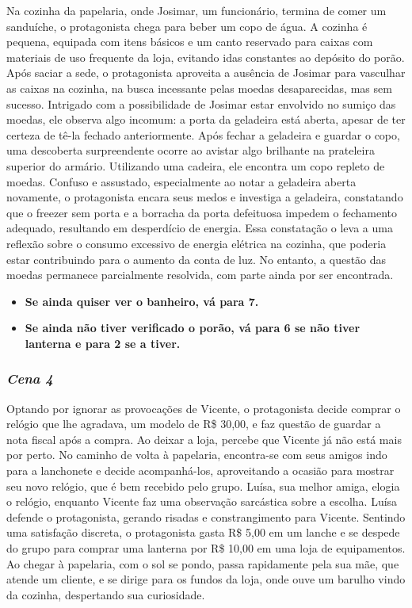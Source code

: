 Na cozinha da papelaria, onde Josimar, um funcionário, termina de comer um sanduíche, o protagonista chega para beber um copo de água. A cozinha é pequena, equipada com itens básicos e um canto reservado para caixas com materiais de uso frequente da loja, evitando idas constantes ao depósito do porão. Após saciar a sede, o protagonista aproveita a ausência de Josimar para vasculhar as caixas na cozinha, na busca incessante pelas moedas desaparecidas, mas sem sucesso. Intrigado com a possibilidade de Josimar estar envolvido no sumiço das moedas, ele observa algo incomum: a porta da geladeira está aberta, apesar de ter certeza de tê-la fechado anteriormente. Após fechar a geladeira e guardar o copo, uma descoberta surpreendente ocorre ao avistar algo brilhante na prateleira superior do armário. Utilizando uma cadeira, ele encontra um copo repleto de moedas. Confuso e assustado, especialmente ao notar a geladeira aberta novamente, o protagonista encara seus medos e investiga a geladeira, constatando que o freezer sem porta e a borracha da porta defeituosa impedem o fechamento adequado, resultando em desperdício de energia. Essa constatação o leva a uma reflexão sobre o consumo excessivo de energia elétrica na cozinha, que poderia estar contribuindo para o aumento da conta de luz. No entanto, a questão das moedas permanece parcialmente resolvida, com parte ainda por ser encontrada.

\begin{itemize}
	\item \textbf{Se ainda quiser ver o banheiro, vá para 7.}
	\item \textbf{Se ainda não tiver verificado o porão, vá para 6 se não tiver lanterna e para 2 se a tiver.}
\end{itemize}


\bigskip\medskip

\subsubsection*{\textit{\textbf{Cena 4}}}

Optando por ignorar as provocações de Vicente, o protagonista decide comprar o relógio que lhe agradava, um modelo de R\$ 30,00, e faz questão de guardar a nota fiscal após a compra. Ao deixar a loja, percebe que Vicente já não está mais por perto. No caminho de volta à papelaria, encontra-se com seus amigos indo para a lanchonete e decide acompanhá-los, aproveitando a ocasião para mostrar seu novo relógio, que é bem recebido pelo grupo. Luísa, sua melhor amiga, elogia o relógio, enquanto Vicente faz uma observação sarcástica sobre a escolha. Luísa defende o protagonista, gerando risadas e constrangimento para Vicente. Sentindo uma satisfação discreta, o protagonista gasta R\$ 5,00 em um lanche e se despede do grupo para comprar uma lanterna por R\$ 10,00 em uma loja de equipamentos. Ao chegar à papelaria, com o sol se pondo, passa rapidamente pela sua mãe, que atende um cliente, e se dirige para os fundos da loja, onde ouve um barulho vindo da cozinha, despertando sua curiosidade.

